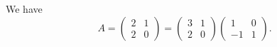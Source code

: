 \documentclass[journal]{IEEEtran}
\begin{document}






We have
\[
A=\begin{pmatrix}2&1\\2&0\end{pmatrix}
=
\begin{pmatrix}3&1\\2&0\end{pmatrix}
\begin{pmatrix}1&0\\-1&1\end{pmatrix}.
\]
\end{document}
